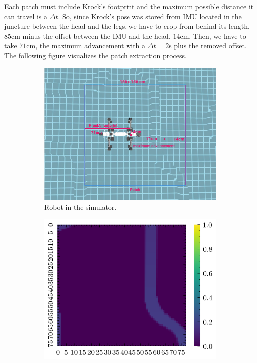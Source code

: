 \documentclass[../document.tex]{subfiles}
\begin{document}
Each patch must include Krock's footprint and the maximum possible distance it can travel is a $\Delta t$. So, since Krock's pose was stored from IMU located in the juncture between the head and the legs, we have to crop from behind its length, $85$cm minus the offset between the IMU and the head, $14$cm. Then, we have to take $71$cm, the maximum advancement with a $\Delta t = 2$s plus the removed offset. The following figure visualizes the patch extraction process. 
\begin{figure}[H]
    \centering
    \begin{subfigure}[b]{0.66\textwidth}
        \includegraphics[width=\textwidth]{../img/3/crop/crop.png}
        \caption{Robot in the simulator.}
    \end{subfigure}
    \begin{subfigure}[b]{0.45\textwidth}
        \includegraphics[width=\textwidth]{../img/3/crop/test-1-2d.png}

\end{subfigure}
\end{figure}
\end{document}
